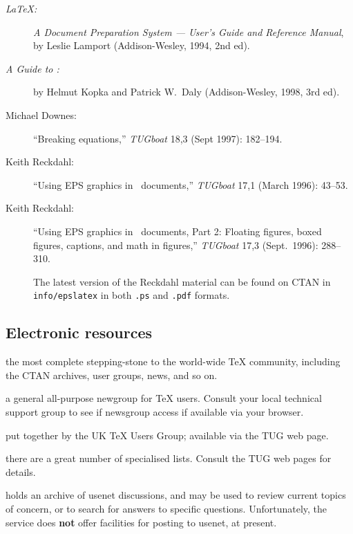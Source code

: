 \begin{description}
   \item [{\sl \LaTeX:}] {\sl A Document Preparation System ---
         User's Guide and Reference Manual\/}, by Leslie
         Lamport (Addison-Wesley, 1994, 2nd ed). 

   \item [{\sl A Guide to \LaTeXe:}] by Helmut Kopka and Patrick
         W.~Daly (Addison-Wesley, 1998, 3rd ed).

   \item [{\rm Michael Downes:}] ``Breaking equations,'' {\sl TUGboat}
         18,3 (Sept 1997): 182--194.

   \item [{\rm Keith Reckdahl:}] ``Using EPS graphics in \LaTeXe\
         documents,'' {\sl TUGboat} 17,1 (March 1996): 43--53.

   \item [{\rm Keith Reckdahl:}] ``Using EPS graphics in \LaTeXe\ documents,
         Part 2: Floating figures, boxed figures, captions, and math
         in figures,'' {\sl TUGboat} 17,3 (Sept.\ 1996): 288--310.

         The latest version of the Reckdahl material can be found on
         {\small CTAN} in \texttt{info/epslatex} in both \texttt{.ps}
         and \texttt{.pdf} formats.
\end{description}


\subsection{Electronic resources}

\begin{description} \itemsep=0pt
   \item [\href{http://www.tug.org/}{www.tug.org}:] the most complete
         stepping-stone to the world-wide \TeX{} community, including
         the {\small CTAN} archives, user groups, news, and so on.

   \item [comp.text.tex] a general all-purpose newgroup for \TeX{}
         users. Consult your local technical support group to see
         if newsgroup access if available via your browser. 

   \item [FAQ:] put together by the UK \TeX{} Users Group; available
         via the {\small TUG} web page.

   \item [Listserv lists:] there are a great number of specialised
         lists. Consult the {\small TUG} web pages for details.

   \item [http://groups.google.com/] holds an archive of usenet
         discussions, and may be used to review current topics of
         concern, or to search for answers to specific questions.
         Unfortunately, the service does {\bf not} offer facilities
         for posting to usenet, at present.
\end{description}

